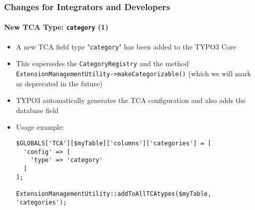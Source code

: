%

\begin{frame}[fragile]
	\frametitle{Changes for Integrators and Developers}
	\framesubtitle{New TCA Type: \texttt{category} (1)}


	\begin{itemize}
		\item A new TCA field type "\texttt{category}" has been added to the TYPO3 Core
		\item This supersedes the \texttt{CategoryRegistry} and the method\newline
			\small
				\texttt{ExtensionManagementUtility->makeCategorizable()}\newline
				(which we will mark as deprecated in the future)
			\normalsize
		\item TYPO3 automatically generates the TCA configuration and also adds
			the database field
		\item Usage example:
\begin{lstlisting}
$GLOBALS['TCA'][$myTable]['columns']['categories'] = [
  'config' => [
    'type' => 'category'
  ]
];

ExtensionManagementUtility::addToAllTCAtypes($myTable, 'categories');
\end{lstlisting}

	\end{itemize}

\end{frame}

